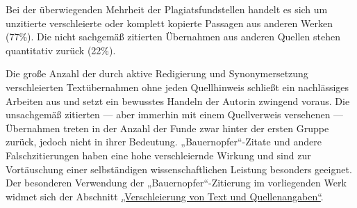 \documentclass[ngerman,final,fontsize=12pt,paper=a4,twoside,bibliography=totoc,BCOR=8mm,draft=false]{scrartcl}
\begin{document}
Bei der überwiegenden Mehrheit der Plagiatsfundstellen handelt es sich um unzitierte verschleierte oder komplett kopierte Passagen aus anderen Werken (77\%). Die nicht sachgemäß zitierten Übernahmen aus anderen Quellen stehen quantitativ zurück (22\%). 


Die große Anzahl der durch aktive Redigierung und Synonymersetzung verschleierten Textübernahmen ohne jeden Quellhinweis schließt ein nachlässiges Arbeiten aus und setzt ein bewusstes Handeln der Autorin zwingend voraus. Die unsachgemäß zitierten --- aber immerhin mit einem Quellverweis versehenen --- Übernahmen treten in der Anzahl der Funde zwar hinter der ersten Gruppe zurück, jedoch nicht in ihrer Bedeutung. „Bauernopfer“-Zitate und andere Falschzitierungen haben eine hohe verschleiernde Wirkung und sind zur Vortäuschung einer selbständigen wissenschaftlichen Leistung besonders geeignet. Der besonderen Verwendung der „Bauernopfer“-Zitierung im vorliegenden Werk widmet sich der Abschnitt %
\href{http://de.vroniplag.wikia.com/wiki/Mm/Bericht-Entwurf\#Verschleierung_von_Text_und_Quellenangaben}{„Verschleierung von Text und Quellenangaben“}. 


\ifhmode\\\fi
 
\end{document}

